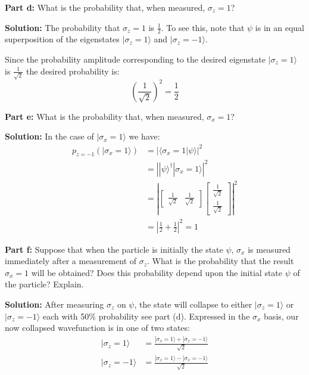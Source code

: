 \documentclass{article}
\begin{document}
\noindent\textbf{Part d:} What is the probability that, when measured, $\sigma_z=1$?
\bigskip

\noindent\textbf{Solution:} The probability that $\sigma_z=1$ is $\frac{1}{2}$. To see this, note that $\psi$ is in an equal superposition of the eigenstates $|\sigma_z=1\rangle$ and $|\sigma_z=-1\rangle$.

Since the probability amplitude corresponding to the desired eigenstate $|\sigma_z=1\rangle$ is $\frac{1}{\sqrt{2}}$ the desired probability is: 
$$\left(\frac{1}{\sqrt{2}}\right)^2=\frac{1}{2}$$
\bigskip

\noindent\textbf{Part e:} What is the probability that, when measured, $\sigma_x=1$?
\bigskip

\noindent\textbf{Solution:} In the case of $|\sigma_x=1\rangle$ we have:
\begin{align*}
    p_{z=-1}(|\sigma_x=1\rangle)&=\left|\langle\sigma_x=1|\psi\rangle\right|^2\\
    &=\left||\psi\rangle^\dagger|\sigma_x=1\rangle\right|^2\\
    &=\left|\begin{bmatrix}
        \frac{1}{\sqrt{2}}&\frac{1}{\sqrt{2}}
    \end{bmatrix}\begin{bmatrix}
        \frac{1}{\sqrt{2}}\\\frac{1}{\sqrt{2}}
    \end{bmatrix}\right|^2\\
    &=\left|\frac{1}{2}+\frac{1}{2}\right|^2=1
\end{align*}
\bigskip

\noindent\textbf{Part f:} Suppose that when the particle is initially the state $\psi$, $\sigma_x$ is measured immediately after a measurement of $\sigma_z$. What is the probability that the result $\sigma_x=1$ will be obtained? Does this probability depend upon the initial state $\psi$ of the particle? Explain.
\bigskip

\noindent\textbf{Solution:} After measuring $\sigma_z$ on $\psi$, the state will collapse to either $|\sigma_z=1\rangle$ or $|\sigma_z=-1\rangle$ each with 50\% probability see part (d). Expressed in the $\sigma_x$ basis, our now collapsed wavefunction is in one of two states:
\begin{align*}
    |\sigma_z=1\rangle&=\frac{|\sigma_x=1\rangle+|\sigma_x=-1\rangle}{\sqrt{2}}\\
    |\sigma_z=-1\rangle&=\frac{|\sigma_x=1\rangle-|\sigma_x=-1\rangle}{\sqrt{2}}
\end{align*}
\end{document}
